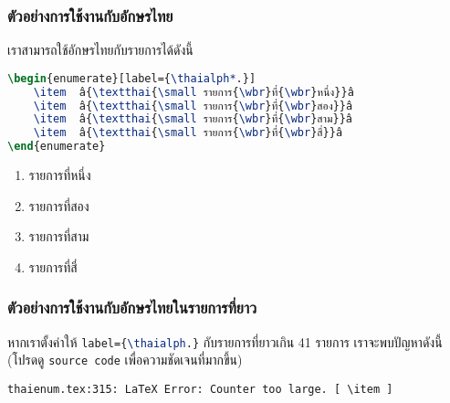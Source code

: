 \documentclass[11pt]{ltxguide}
\renewcommand{\baselinestretch}{1.5}
\begin{document}
\subsubsection{ตัวอย่าง{\wbr}การ{\wbr}ใช้งาน{\wbr}กับ{\wbr}อักษร{\wbr}ไทย}

เรา{\wbr}สามารถ{\wbr}ใช้{\wbr}อักษร{\wbr}ไทย{\wbr}กับ{\wbr}รายการ{\wbr}ได้{\wbr}ดังนี้{\wbr}

\smallskip
\renewcommand{\baselinestretch}{0.1}
\begin{lstlisting}[language=LaTeX,escapechar={â},basicstyle=\ttfamily,lineskip={0.05pc}]
\begin{enumerate}[label={\thaialph*.}]
    \item  â{\textthai{\small รายการ{\wbr}ที่{\wbr}หนึ่ง}}â
    \item  â{\textthai{\small รายการ{\wbr}ที่{\wbr}สอง}}â
    \item  â{\textthai{\small รายการ{\wbr}ที่{\wbr}สาม}}â
    \item  â{\textthai{\small รายการ{\wbr}ที่{\wbr}สี่}}â
\end{enumerate}
\end{lstlisting}
\renewcommand{\baselinestretch}{1.5}

\begin{enumerate}[topsep=0pc,itemsep=0pc,label={\thaialph*.}]
    \item  รายการ{\wbr}ที่{\wbr}หนึ่ง{\wbr}
    \item  รายการ{\wbr}ที่{\wbr}สอง{\wbr}
    \item  รายการ{\wbr}ที่{\wbr}สาม{\wbr}
    \item  รายการ{\wbr}ที่{\wbr}สี่{\wbr}
\end{enumerate}

\newpage
\subsubsection{ตัวอย่าง{\wbr}การ{\wbr}ใช้งาน{\wbr}กับ{\wbr}อักษร{\wbr}ไทย{\wbr}ใน{\wbr}รายการ{\wbr}ที่{\wbr}ยาว}

หาก{\wbr}เรา{\wbr}ตั้ง{\wbr}ค่า{\wbr}ให้ \lstinline[language=LaTeX]!label={\thaialph.}! กับ{\wbr}รายการ{\wbr}ที่{\wbr}ยาว{\wbr}เกิน 41 รายการ เรา{\wbr}จะ{\wbr}พบ{\wbr}ปัญหา{\wbr}ดังนี้ (โปรด{\wbr}ดู \texttt{source code} เพื่อ{\wbr}ความ{\wbr}ชัดเจน{\wbr}ที่{\wbr}มาก{\wbr}ขึ้น)
\begin{center}
    \color{red}\texttt{thaienum.tex:315: LaTeX Error: Counter too large. [ {\textbackslash}item ]}
\end{center}
\end{document}
